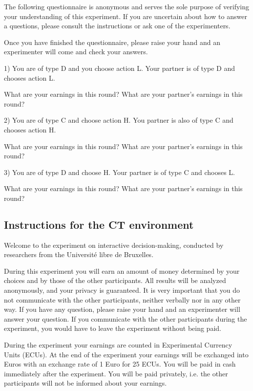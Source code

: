 \documentclass[12pt]{article}
\theoremstyle{break}
\begin{document}
The following questionnaire is anonymous and serves the sole purpose of verifying your understanding of this experiment. If you are uncertain about how to answer a questions, please consult the instructions or ask one of the experimenters.

Once you have finished the questionnaire, please raise your hand and an experimenter will come and check your answers.

1) You are of type D and you choose action L. Your partner is of type D and chooses action L.

What are your earnings in this round?
What are your partner’s earnings in this round?

2) You are of type C and choose action H. You partner is also of type C and chooses action H.

What are your earnings in this round?
What are your partner’s earnings in this round?


3) You are of type D and choose H. Your partner is of type C and chooses L.

What are your earnings in this round?
What are your partner’s earnings in this round?


\subsection{Instructions for the CT environment}

Welcome to the experiment on interactive decision-making, conducted by researchers from the Université libre de Bruxelles.

During this experiment you will earn an amount of money determined by your choices and by those of the other participants. All results will be analyzed anonymously, and your privacy is guaranteed. It is very important that you do not communicate with the other participants, neither verbally nor in any other way. If you have any question, please raise your hand and an experimenter will answer your question. If you communicate with the other participants during the experiment, you would have to leave the experiment without being paid. 

During the experiment your earnings are counted in Experimental Currency Units (ECUs). At the end of the experiment your earnings will be exchanged into Euros with an exchange rate of 1 Euro for 25 ECUs. You will be paid in cash immediately after the experiment. You will be paid privately, i.e. the other participants will not be informed about your earnings.
\end{document}

